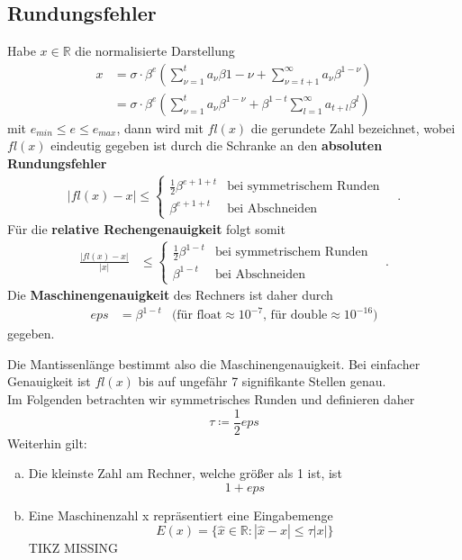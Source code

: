 \documentclass[ngerman,fontsize=11pt, paper=a4, parskip=false, titlepage=false, toc=bib]{scrbook}
\newcommand{\R}{\mathbb{R}}
\begin{document}
\subsection{Rundungsfehler} \label{3.1.6}
Habe $x\in \R $ die normalisierte Darstellung
\begin{align*}
	x &= \sigma \cdot \beta^e (\sum_{\nu=1}^{t}a_{\nu}\beta{1-\nu} + \sum_{\nu=t+1}^{\infty}a_{\nu}\beta^{1-\nu} ) \\
	  &= \sigma \cdot \beta^e (\sum_{\nu=1}^{t}a_{\nu}\beta^{1-\nu} + \beta^{1-t}\sum_{l=1}^{\infty}a_{t+l}\beta^{l} )
\end{align*}
mit $e_{min} \leq e \leq e_{max}$, dann wird mit $fl(x)$ die gerundete Zahl bezeichnet, wobei $fl(x)$ 
eindeutig gegeben ist durch die Schranke an den \textbf{absoluten Rundungsfehler} 
\begin{align*}
	| fl(x) - x | \leq \begin{cases}
								\frac{1}{2}\beta^{e+1+t} & \text{bei symmetrischem Runden}\\
								\beta^{e+1+t}                    & \text{bei Abschneiden}
							\end{cases} \quad .
\end{align*}
Für die \textbf{relative Rechengenauigkeit} folgt somit 
\begin{align*}
\frac{| fl(x) - x | }{|x|} & \leq \begin{cases}
												\frac{1}{2}\beta^{1-t} & \text{bei symmetrischem Runden}\\
												\beta^{1-t}                    & \text{bei Abschneiden}
											\end{cases} \quad .
\end{align*}
Die \textbf{Maschinengenauigkeit}  des Rechners ist daher durch 
\begin{align*}
	  eps &= \beta^{1-t} & \text{(für float}\approx 10^{-7}  \text{, für double} \approx10^{-16} )
\end{align*}
gegeben.

Die Mantissenlänge bestimmt also die Maschinengenauigkeit. Bei einfacher Genauigkeit ist $fl(x)$ bis auf ungefähr 7 signifikante Stellen genau. \\
Im Folgenden betrachten wir symmetrisches Runden und definieren daher
\[ \tau \coloneqq \frac{1}{2}eps\]
Weiterhin gilt:
\begin{enumerate}[a)]
	\item Die kleinste Zahl am Rechner, welche größer als 1 ist, ist
					\[ 1 + eps \]
	\item Eine Maschinenzahl x repräsentiert eine Eingabemenge
					\[  E(x) = \{\widehat{x} \in \R : |\widehat{x}-x| \leq \tau|x|\} \]
					TIKZ MISSING
\end{enumerate}
\end{document}
